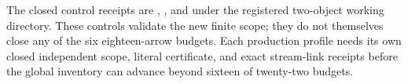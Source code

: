 The closed control receipts are
,
, and
 under the registered
two-object working directory.  These controls validate the new finite
scope; they do not themselves close any of the six eighteen-arrow budgets.
Each production profile needs its own closed independent scope, literal
certificate, and exact stream-link receipts before the global inventory can
advance beyond sixteen of twenty-two budgets.
